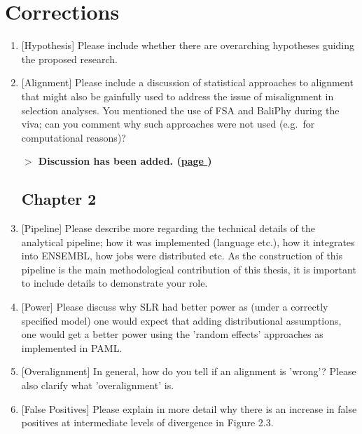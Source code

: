 \section*{Corrections}

\newcommand{\resp}[2]{{\bf $>$ #1 (\hyperref[#2]{page \pageref{#2}})}}

\begin{enumerate}

\subsection{Chapter 1}

\item{[Hypothesis] Please include whether there are overarching hypotheses guiding the
proposed research.}

\item{[Alignment] Please include a discussion of statistical approaches to alignment
that might also be gainfully used to address the issue of misalignment
in selection analyses. You mentioned the use of FSA and BaliPhy during
the viva; can you comment why such approaches were not used (e.g.\ for
computational reasons)?
\label{Alignment_correction}

\resp{Discussion has been added.}{Alignment}
}

\subsection{Chapter 2}
\item{[Pipeline] Please describe more regarding the technical details of the analytical
pipeline; how it was implemented (language etc.), how it integrates
into ENSEMBL, how jobs were distributed etc. As the construction of
this pipeline is the main methodological contribution of this thesis,
it is important to include details to demonstrate your role.}

\item{[Power] Please discuss why SLR had better power as (under a correctly
specified model) one would expect that adding distributional
assumptions, one would get a better power using the 'random effects'
approaches as implemented in PAML.}

\item{[Overalignment] In general, how do you tell if an alignment is 'wrong'? Please also
clarify what 'overalignment' is.}

\item{[False Positives] Please explain in more detail why there is an increase in false
positives at intermediate levels of divergence in Figure 2.3.}


\end{enumerate}
